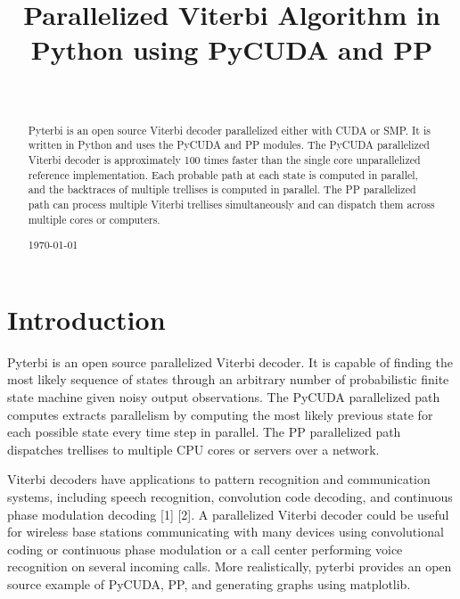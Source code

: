 \documentclass[journal,onecolumn]{IEEEtran}
\begin{document}
\title{Parallelized Viterbi Algorithm in Python using PyCUDA and PP}
\author{\\
    }


\maketitle

\begin{abstract}
Pyterbi is an open source Viterbi decoder parallelized either with CUDA or SMP. It is written in Python and uses the PyCUDA and PP modules. The PyCUDA parallelized Viterbi decoder is approximately 100 times faster than the single core unparallelized reference implementation. Each probable path at each state is computed in parallel, and the backtraces of multiple trellises is computed in parallel. The PP parallelized path can process multiple Viterbi trellises simultaneously and can dispatch them across multiple cores or computers.  

\hfill \today 
\end{abstract}

\section{Introduction}
Pyterbi is an open source parallelized Viterbi decoder. It is capable of finding the most likely sequence of states through an arbitrary number of probabilistic finite state machine given noisy output observations. The PyCUDA parallelized path computes extracts parallelism by computing the most likely previous state for each possible state every time step in parallel. The PP parallelized path dispatches trellises to multiple CPU cores or servers over a network.


Viterbi decoders have applications to pattern recognition and communication systems, including speech recognition, convolution code decoding, and continuous phase modulation decoding [1] [2]. A parallelized Viterbi decoder could be useful for wireless base stations communicating with many devices using convolutional coding or continuous phase modulation or a call center performing voice recognition on several incoming calls. More realistically, pyterbi provides an open source example of PyCUDA, PP, and generating graphs using matplotlib.   
\end{document}
